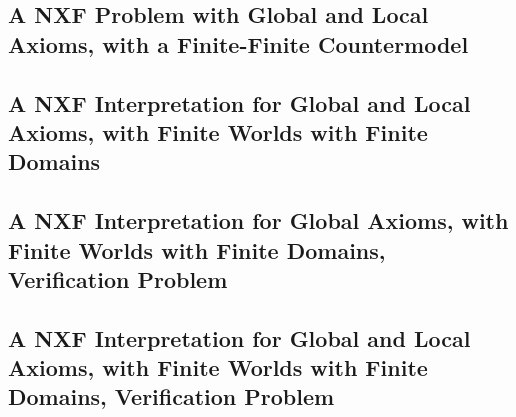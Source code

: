\documentclass{easychair}
\begin{document}
\newpage
\subsection{A NXF Problem with Global and Local Axioms, with a Finite-Finite Countermodel}
\label{NTF_Finite-Finite-Local.p}
\begin{small}

\end{small}

\newpage
\subsection{A NXF Interpretation for Global and Local Axioms, with Finite Worlds with Finite Domains}
\label{NTF_Finite-Finite-Local.s}
\begin{small}

\end{small}

\newpage
\subsection{A NXF Interpretation for Global Axioms, with Finite Worlds with Finite Domains, Verification Problem}
\label{NTF_Finite-Finite-Global.s.p}
\begin{small}

\end{small}

\newpage
\subsection{A NXF Interpretation for Global and Local Axioms, with Finite Worlds with Finite Domains, Verification Problem}
\label{NTF_Finite-Finite-Local.s.p}
\begin{small}

\end{small}

\end{document}
